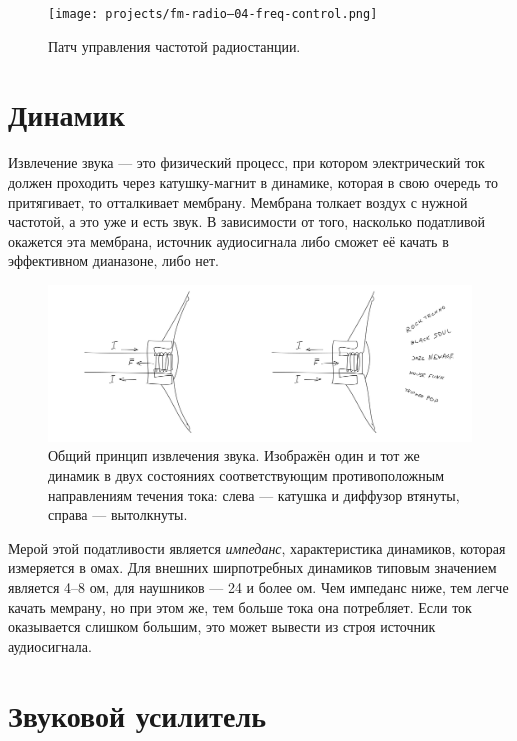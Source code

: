 \begin{figure}
  \centering
  \texttt{[image: projects/fm-radio--04-freq-control.png]}
  \caption{Патч управления частотой радиостанции.}
  \label{patch:freq-control}
\end{figure}

\section{Динамик}


Извлечение звука — это физический процесс, при котором электрический ток должен проходить через катушку-магнит в динамике, которая в свою очередь то притягивает, то отталкивает мембрану. Мембрана толкает воздух с нужной частотой, а это уже и есть звук. В зависимости от того, насколько податливой окажется эта мембрана, источник аудиосигнала либо сможет её качать в эффективном дианазоне, либо нет.

\begin{figure}
  \centering
  \includegraphics{sketches/speaker-internals}
  \caption{Общий принцип извлечения звука. Изображён один и тот же динамик в двух состояниях соответствующим противоположным направлениям течения тока: слева — катушка и диффузор втянуты, справа — вытолкнуты.}
\end{figure}

Мерой этой податливости является \emph{импеданс}, характеристика динамиков, которая измеряется в омах. Для внешних ширпотребных динамиков типовым значением является 4--8 ом, для наушников — 24 и более ом. Чем импеданс ниже, тем легче качать мемрану, но при этом же, тем больше тока она потребляет. Если ток оказывается слишком большим, это может вывести из строя источник аудиосигнала.

\section{Звуковой усилитель}

